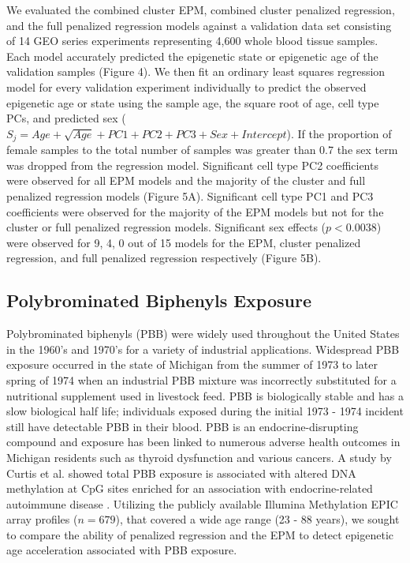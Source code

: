 \documentclass{article}
\begin{document}
{\begin{linenumbers}
We evaluated the combined cluster EPM, combined cluster penalized regression, and the full penalized regression models 
against a validation data set consisting of 14 GEO series experiments representing 4,600 whole blood tissue samples. 
Each model accurately predicted the epigenetic state or epigenetic age of the validation samples (Figure 4). We then 
fit an ordinary least squares regression model for every validation experiment individually to predict the observed 
epigenetic age or state using the sample age, the square root of age, cell type PCs, and predicted sex 
($S_j  = Age + \sqrt{Age} + PC1 + PC2 + PC3 + Sex + Intercept$). If the proportion of female samples to the total 
number of samples was greater than 0.7 the sex term was dropped from the regression model. Significant cell type 
PC2 coefficients were observed for all EPM models and the majority of the cluster and full penalized regression 
models (Figure 5A). Significant cell type PC1 and PC3 coefficients were observed for the majority of the EPM models 
but not for the cluster or full penalized regression models. Significant sex effects ($p < 0.0038$) were 
observed for 9, 4, 0 out of 15 models for the EPM, cluster penalized regression, and full penalized regression 
respectively (Figure 5B). 

\subsection{Polybrominated Biphenyls Exposure}

Polybrominated biphenyls (PBB) were widely used throughout the United States in the 1960’s and 1970’s for a variety of 
industrial applications. Widespread PBB exposure occurred in the state of Michigan from the summer of 1973 to later 
spring of 1974 when an industrial PBB mixture was incorrectly substituted for a nutritional supplement used in livestock 
feed\cite{Fries1985-nf}. PBB is biologically stable and has a slow biological half life; individuals exposed during the 
initial 1973 - 1974 incident still have detectable PBB in their blood\cite{Safe1984-sz}. PBB is an endocrine-disrupting 
compound and exposure has been linked to numerous adverse health outcomes in Michigan residents such as thyroid 
dysfunction\cite{Jacobson2017-yi,Curtis2019-mv} and various cancers\cite{Terrell2016-yw,Hoque1998-so}. A study by 
Curtis et al. showed total PBB exposure is associated with altered DNA methylation at CpG sites enriched for an 
association with endocrine-related autoimmune disease \cite{Curtis2019-gz}. Utilizing the publicly available 
Illumina Methylation EPIC array \cite{Pidsley2016-bg}  profiles ($n=679$), that covered a wide age range 
(23 - 88 years), we sought to compare the ability of penalized regression and the EPM to detect epigenetic age 
acceleration associated with PBB exposure. 


\end{linenumbers}}
\end{document}
